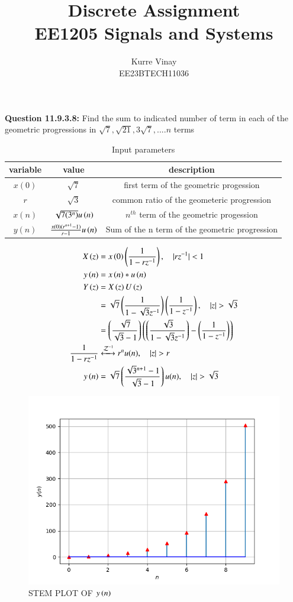 \documentclass[a4,12pt,onecolumn]{IEEEtran}
\begin{document}
\title{
\Huge\textbf{Discrete Assignment}\\
\Huge\textbf{EE1205} Signals and Systems\\
}
\large\author{Kurre Vinay\\EE23BTECH11036}
\maketitle
\textbf{Question 11.9.3.8:}
Find the sum to indicated number of term in each of the geometric progressions in $\sqrt{7} ,\sqrt{21} , 3\sqrt{7}, ....n$ terms\\
\solution
\begin{table}[h!]
 \begin{center}
\begin{tabular}{|c|c|c|}
   \hline
   variable&value&description  \\
   \hline
   $x(0)$ & $ \sqrt{7} $& first term of the geometric progession\\
   \hline
   $r$ & $\sqrt{3}$ & common ratio of the geometeric progression\\
   \hline
   $x(n)$ & $\sqrt{7(3^{n})}u\left(n\right)$& $n^{th}$ term of the geometric progession\\
   \hline
   $y(n)$ &$\frac{x(0)(r^{n+1}-1)}{r-1}u\left(n\right)$ &Sum of the n term of the geometric progression\\
   \hline 
\end{tabular}
\caption{Input parameters}
\end{center}
\end{table}

\begin{align}
X\brak{z} &= x\brak{0}\brak{\frac{1}{1-rz^{-1}}}, \quad{|rz^{-1}|<1}\\
y\brak{n} &= x\brak{n}*u\brak{n}\\
Y\brak{z} &= X\brak{z}U\brak{z}\\
&=\sqrt{7}\brak{\frac{1}{1-\sqrt{3}z^{-1}}}\brak{\frac{1}{1-z^{-1}}} ,\quad{|z|>\sqrt{3}}\\
&=\brak{\frac{\sqrt{7}}{\sqrt{3}-1}}\brak{\brak{\frac{\sqrt{3}}{1-\sqrt{3}z^{-1}}}-\brak{\frac{1}{1-z^{-1}}}}\\
\frac{1}{1-rz^{-1}} &\xleftrightarrow{\mathcal{Z}^{-1}}  r^nu(n), \quad{|z|>r}\\
y\brak{n} &= \sqrt{7}\brak{\frac{\sqrt{3}^{n+1}-1}{\sqrt{3}-1}}u(n) , \quad{|z|>\sqrt{3}}
\end{align}

\begin{figure}[ht!]
\includegraphics[width=\columnwidth]{fig/fig1.png}
\caption{\large{STEM PLOT OF $y\left(n\right)$}}
\end{figure}
\end{document}
